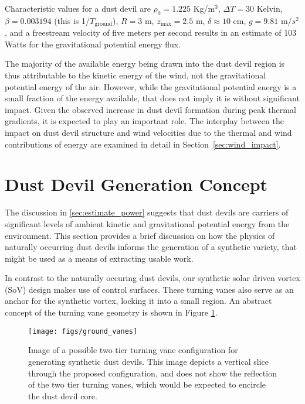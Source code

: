 Characteristic values for a dust devil are $\rho_0 = 1.225$ Kg/$\text{m}^3$, 
$\Delta T= 30$ Kelvin, $\beta = 0.003194$ (this is 1/$T_{\text{ground}}$), 
$R = 3 $ m, $z_\text{max} = 2.5$ m, $\delta \approx 10$ cm, $g=9.81$ m/$s^2$, and a
freestream velocity of five meters per second results in an estimate of
103 Watts for the gravitational potential energy flux. 

The majority of the available energy being drawn into the dust devil
region is thus attributable to the kinetic energy of the wind, not the
gravitational potential energy of the air.  
However, while the gravitational potential energy is a small fraction of
the energy available, that does not imply it is without significant
impact. 
Given the observed increase in dust devil formation during peak thermal
gradients, it is expected to play an important role. The interplay
between the impact on dust devil structure and wind velocities due to
the thermal and wind contributions of energy are examined in detail in
Section~\ref{sec:wind_impact}. 

\section{Dust Devil Generation Concept}
\label{sec:dust_devil_concept}

The discussion in \ref{sec:estimate_power} suggests that dust devils are
carriers of significant levels of ambient kinetic and gravitational
potential energy from the environment. This section provides a brief
discussion on how the physics of naturally occurring dust devils informs
the generation of a synthetic variety, that might be used as a means of
extracting usable work.    

In contrast to the naturally occuring dust devils,
our synthetic solar driven vortex (SoV) design makes use of
control surfaces. These turning vanes also serve as an anchor for the
synthetic vortex, locking it into a small region. An abstract concept of
the turning vane geometry is shown in Figure \ref{fig:cartoon_vanes}.

  \begin{figure}[!htb]
    \begin{center}
     \texttt{[image: figs/ground\_vanes]}
     \caption{Image of a possible two tier turning vane 
       configuration for generating synthetic dust devils. This image depicts a 
       vertical slice through the proposed configuration, and does not show the reflection 
       of the two tier turning vanes, which would be expected to encircle the dust devil core.}
     \label{fig:cartoon_vanes}
    \end{center}
  \end{figure}

